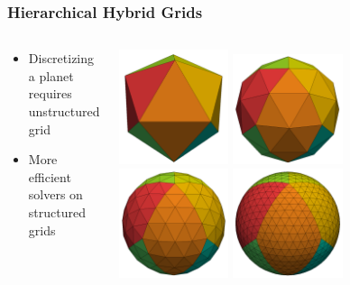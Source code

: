 \documentclass[t,compress=false,usepdftitle=false]{beamer}
\begin{document}
\begin{frame}\frametitle{Hierarchical Hybrid Grids}
\begin{columns}
\vspace{-5mm}
\begin{myColorBox}{.9}{}\color{linkcolor}
\centering
\begin{itemize}
 \item Discretizing a planet requires unstructured grid
 \item More efficient solvers on structured grids
\end{itemize}
\end{myColorBox}
\vspace{-3mm}
\centering
\includegraphics[width=0.32\textwidth]{icosaeder-0ref-crop.png}
\includegraphics[width=0.32\textwidth]{icosaeder-1ref-crop.png}\\
\includegraphics[width=0.32\textwidth]{icosaeder-2ref-crop.png}
\includegraphics[width=0.32\textwidth]{icosaeder-3ref-crop.png}

\end{columns}
\end{frame}
\end{document}
